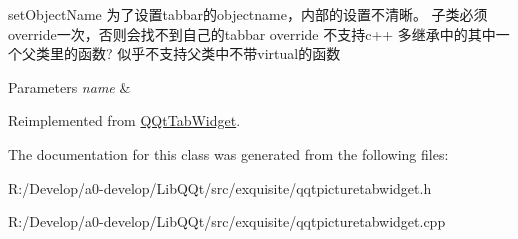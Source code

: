 set\+Object\+Name 为了设置tabbar的objectname，内部的设置不清晰。 子类必须override一次，否则会找不到自己的tabbar override 不支持c++ 多继承中的其中一个父类里的函数? 似乎不支持父类中不带virtual的函数 


\begin{DoxyParams}{Parameters}
{\em name} & \\
\hline
\end{DoxyParams}


Reimplemented from \mbox{\hyperlink{class_q_qt_tab_widget_a45cec441f1ceb658d628a23c110359f3}{Q\+Qt\+Tab\+Widget}}.



The documentation for this class was generated from the following files\+:\begin{DoxyCompactItemize}
\item 
R\+:/\+Develop/a0-\/develop/\+Lib\+Q\+Qt/src/exquisite/qqtpicturetabwidget.\+h\item 
R\+:/\+Develop/a0-\/develop/\+Lib\+Q\+Qt/src/exquisite/qqtpicturetabwidget.\+cpp\end{DoxyCompactItemize}
